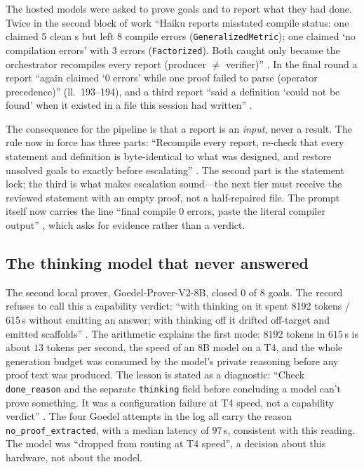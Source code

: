 The hosted models were asked to prove goals and to report what they had done. Twice in the
second block of work ``Haiku reports misstated compile status: one claimed 5 clean
s but left 8 compile errors (\texttt{GeneralizedMetric}); one claimed `no
compilation errors' with 3 errors (\texttt{Factorized}). Both caught only because the
orchestrator recompiles every report (producer $\ne$ verifier)'' . In the final round a report ``again claimed `0 errors' while one proof
failed to parse (operator precedence)'' (ll.~193--194), and a third report ``said a
definition `could not be found' when it existed in a file this session had written''
.

The consequence for the pipeline is that a report is an \emph{input}, never a result. The
rule now in force has three parts: ``Recompile every report, re-check that every statement
and definition is byte-identical to what was designed, and restore unsolved goals to exactly
 before escalating'' . The second part is the
statement lock; the third is what makes escalation sound---the next tier must receive the
reviewed statement with an empty proof, not a half-repaired file. The prompt itself now
carries the line ``final compile 0 errors, paste the literal compiler output''
, which asks for evidence rather than a verdict.

\subsection{The thinking model that never answered}\label{sec:pipeline:thinking}

The second local prover, Goedel-Prover-V2-8B, closed 0 of 8 goals. The record refuses to
call this a capability verdict: ``with thinking on it spent 8192 tokens / 615\,s without
emitting an answer; with thinking off it drifted off-target and emitted 
scaffolds'' . The arithmetic explains the first
mode: $8192$ tokens in $615$\,s is about $13$ tokens per second, the speed of an 8B model
on a T4, and the whole generation budget was consumed by the model's private reasoning
before any proof text was produced. The lesson is stated as a diagnostic: ``Check
\texttt{done\_reason} and the separate \texttt{thinking} field before concluding a model can't
prove something. It was a configuration failure at T4 speed, not a capability verdict''
. The four Goedel attempts in the log all carry the reason
\texttt{no\_proof\_extracted}, with a median latency of $97$\,s, consistent with this
reading. The model was ``dropped from routing at T4 speed'', a decision about this hardware,
not about the model.

